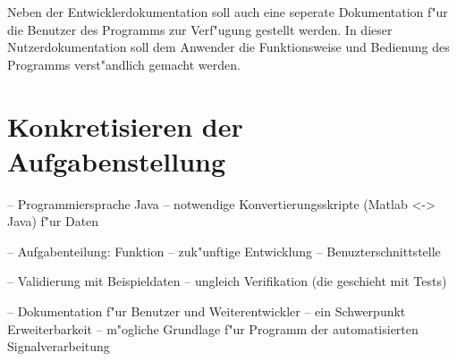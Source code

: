 Neben der Entwicklerdokumentation soll auch eine seperate Dokumentation f"ur die Benutzer des Programms zur Verf"ugung gestellt werden.
In dieser Nutzerdokumentation soll dem Anwender die Funktionsweise und Bedienung des Programms verst"andlich gemacht werden.

\section{Konkretisieren der Aufgabenstellung}

-- Programmiersprache Java
-- notwendige Konvertierungsskripte (Matlab <-> Java) f"ur Daten

-- Aufgabenteilung: Funktion
-- zuk"unftige Entwicklung
-- Benuzterschnittstelle

-- Validierung mit Beispieldaten
-- ungleich Verifikation (die geschieht mit Tests)

-- Dokumentation f"ur Benutzer und Weiterentwickler
-- ein Schwerpunkt Erweiterbarkeit
-- m"ogliche Grundlage f"ur Programm der automatisierten Signalverarbeitung

